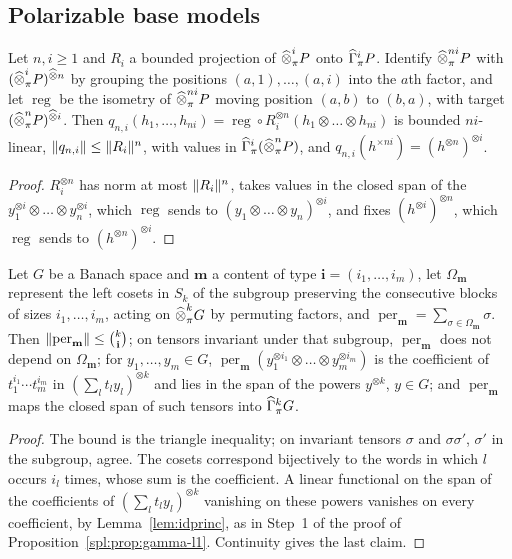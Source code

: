 \subsection{Polarizable base models}\label{fmo:ssec:polarizable}

\begin{lemma}\label{fmo:lem:regroup}
Let $n,i\ge1$ and $R_i$ a bounded projection of $\mathbin{\widehat\otimes}^i_\pi P$ onto $\widehat\Gamma^i_\pi P$. Identify $\mathbin{\widehat\otimes}^{ni}_\pi P$ with
$(\mathbin{\widehat\otimes}^i_\pi P)^{\mathbin{\widehat\otimes} n}$ by grouping the positions $(a,1),\dots,(a,i)$ into the $a$th factor, and let $\operatorname{reg}$ be
the isometry of $\mathbin{\widehat\otimes}^{ni}_\pi P$ moving position $(a,b)$ to $(b,a)$, with target $(\mathbin{\widehat\otimes}^n_\pi P)^{\mathbin{\widehat\otimes} i}$. Then
$q_{n,i}(h_1,\dots,h_{ni})=\operatorname{reg}\circ R_i^{\otimes n}(h_1\otimes\dots\otimes h_{ni})$ is bounded $ni$-linear,
$\lVert q_{n,i}\rVert\le\lVert R_i\rVert^n$, with values in $\widehat\Gamma^i_\pi(\mathbin{\widehat\otimes}^n_\pi P)$, and $q_{n,i}(h^{\times ni})=
(h^{\otimes n})^{\otimes i}$.
\end{lemma}

\begin{proof}
$R_i^{\otimes n}$ has norm at most $\lVert R_i\rVert^n$, takes values in the closed span of the $y_1^{\otimes i}\otimes\dots\otimes
y_n^{\otimes i}$, which $\operatorname{reg}$ sends to $(y_1\otimes\dots\otimes y_n)^{\otimes i}$, and fixes
$(h^{\otimes i})^{\otimes n}$, which $\operatorname{reg}$ sends to $(h^{\otimes n})^{\otimes i}$.
\end{proof}

\begin{lemma}\label{fmo:lem:per}
Let $G$ be a Banach space and $\mathbf m$ a content of type $\mathbf i=(i_1,\dots,i_m)$, let $\Omega_{\mathbf m}$ represent
the left cosets in $S_k$ of the subgroup preserving the consecutive blocks of sizes $i_1,\dots,i_m$, acting on
$\mathbin{\widehat\otimes}^k_\pi G$ by permuting factors, and $\operatorname{per}_{\mathbf m}=\sum_{\sigma\in\Omega_{\mathbf m}}\sigma$. Then
$\lVert \operatorname{per}_{\mathbf m}\rVert\le\binom k{\mathbf i}$; on tensors invariant under that subgroup,
$\operatorname{per}_{\mathbf m}$ does not depend on $\Omega_{\mathbf m}$; for $y_1,\dots,y_m\in G$,
$\operatorname{per}_{\mathbf m}(y_1^{\otimes i_1}\otimes\dots\otimes y_m^{\otimes i_m})$ is the coefficient of
$t_1^{i_1}\cdots t_m^{i_m}$ in $(\sum_lt_ly_l)^{\otimes k}$ and lies in the span of the powers $y^{\otimes k}$, $y\in G$;
and $\operatorname{per}_{\mathbf m}$ maps the closed span of such tensors into $\widehat\Gamma^k_\pi G$.
\end{lemma}

\begin{proof}
The bound is the triangle inequality; on invariant tensors $\sigma$ and $\sigma\sigma'$, $\sigma'$ in the subgroup, agree.
The cosets correspond bijectively to the words in which $l$ occurs $i_l$ times, whose sum is the coefficient. A linear
functional on the span of the coefficients of $(\sum_lt_ly_l)^{\otimes k}$ vanishing on these powers vanishes on every
coefficient, by Lemma~\ref{lem:idprinc}, as in Step~1 of the proof of Proposition~\ref{spl:prop:gamma-l1}. Continuity gives
the last claim.
\end{proof}

